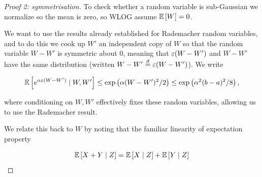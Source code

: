 \documentclass[11pt]{scrartcl}
\begin{document}
\begin{proof}[Proof 2: symmetrisation]
To check whether a random variable is sub-Gaussian we normalize so the mean is zero, so WLOG assume $\mathbb{E} \left[ W \right]=0$.

We want to use the results already established for Rademacher random variables, and to do this we cook up $W'$ an independent copy of $W$ so that the random variable $W-W'$ is symmetric about 0, meaning that $\varepsilon (W - W')$ and $W - W'$ have the same distribution (written $W - W' \stackrel{d}{=} \varepsilon(W - W')$). We write %

\begin{equation}
    \mathbb{E} \left[ e^{\alpha \varepsilon (W-W')} \mid W, W' \right] \le \text{exp} \left( \alpha (W-W')^2 / 2 \right) \le \text{exp} \left( \alpha^2 (b-a)^2 / 8 \right),
\label{L3 ideal Hoeffding}
\end{equation}

where conditioning on $W, W'$ effectively fixes these random variables, allowing us to use the Rademacher result.







We relate this back to $W$ by noting that the familiar linearity of expectation property

\begin{equation}
    \mathbb{E} \left[ X + Y \mid Z \right] = \mathbb{E} \left[ X \mid Z \right] + \mathbb{E} \left[ Y \mid Z \right]
\end{equation}


\end{proof}
\end{document}
